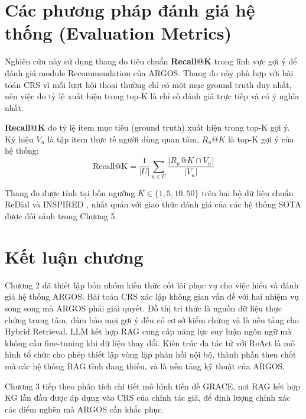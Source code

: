 \section{Các phương pháp đánh giá hệ thống (Evaluation Metrics)}
Nghiên cứu này sử dụng thang đo tiêu chuẩn \textbf{Recall@K} trong lĩnh vực gợi ý để đánh giá module Recommendation của ARGOS. Thang đo này phù hợp với bài toán CRS vì mỗi lượt hội thoại thường chỉ có một mục ground truth duy nhất, nên việc đo tỷ lệ xuất hiện trong top-K là chỉ số đánh giá trực tiếp và có ý nghĩa nhất.

\textbf{Recall@K} đo tỷ lệ item mục tiêu (ground truth) xuất hiện trong top-K gợi ý. Ký hiệu $V_u$ là tập item thực tế người dùng quan tâm, $R_u@K$ là top-K gợi ý của hệ thống:
\begin{equation}
    \text{Recall@K} = \frac{1}{|U|} \sum_{u \in U} \frac{|R_u@K \cap V_u|}{|V_u|}
\end{equation}

Thang đo được tính tại bốn ngưỡng $K \in \{1, 5, 10, 50\}$ trên hai bộ dữ liệu chuẩn ReDial \cite{li2018towards} và INSPIRED \cite{hayati-etal-2020-inspired}, nhất quán với giao thức đánh giá của các hệ thống SOTA được đối sánh trong Chương 5.

\section*{Kết luận chương}

Chương 2 đã thiết lập bốn nhóm kiến thức cốt lõi phục vụ cho việc hiểu và đánh giá hệ thống ARGOS. Bài toán CRS xác lập không gian vấn đề với hai nhiệm vụ song song mà ARGOS phải giải quyết. Đồ thị tri thức là nguồn dữ liệu thực chứng trung tâm, đảm bảo mọi gợi ý đều có cơ sở kiểm chứng và là nền tảng cho Hybrid Retrieval. LLM kết hợp RAG cung cấp năng lực suy luận ngôn ngữ mà không cần fine-tuning khi dữ liệu thay đổi. Kiến trúc đa tác tử với ReAct là mô hình tổ chức cho phép thiết lập vòng lặp phản hồi nội bộ, thành phần then chốt mà các hệ thống RAG tĩnh đang thiếu, và là nền tảng kỹ thuật của ARGOS.

Chương 3 tiếp theo phân tích chi tiết mô hình tiền đề GRACE, nơi RAG kết hợp KG lần đầu được áp dụng vào CRS của chính tác giả, để định lượng chính xác các điểm nghẽn mà ARGOS cần khắc phục.
